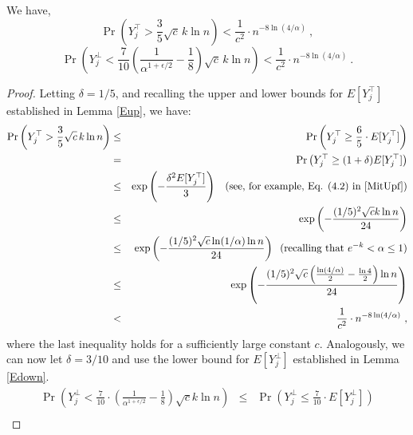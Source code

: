\documentclass[11pt]{article}
\begin{document}
\begin{lemma}\label{lepa1}
We have,
\begin{equation*}
    	\Pr\left(Y^{\top}_j >  \frac{3}{5}\sqrt{c}\, k \ln n \right) 
     <  \frac{1}{c^2} \cdot n^{-8\ln(4/\alpha)}  \ , 
\end{equation*}
\begin{equation*}
    	\Pr\left(Y^{\perp}_j <  
     \frac{7}{10} \left (\frac{1}{\alpha^{1+\epsilon/2}} - \frac{1}{8} \right ) \sqrt{c}\, k \ln n \right)  
     <  \frac{1}{c^2} \cdot n^{-8\ln(4/\alpha)}  \ .
\end{equation*}
\end{lemma}

\begin{proof}

Letting $\delta = 1/5$, and recalling the upper and lower bounds for 
$E[Y^{\top}_j]$ established in Lemma \ref{Eup}, we have:
    \begin{eqnarray*}
    	\Pr\left(Y^{\top}_j >  \frac{3}{5} \sqrt{c}\, k \ln n \right)   
    	&\le &  \Pr\left(Y^{\top}_{j} \ge \frac{6}{5}\cdot E[Y^{\top}_j] \right) \\ 
    	&=   &  \Pr\left(Y^{\top}_{j} \ge (1+\delta) E[Y^{\top}_j] \right) \\      
    	&\le & \exp\left(-\frac{\delta^2 E[Y^{\top}_j]}{3}\right) \;\;\; \text{(see, for example, Eq. (4.2) in \cite{MitUpf})} \nonumber \\
    	&\le & \exp\left(- \frac{(1/5)^2  \sqrt{c} k \ln n}{24 }\right)  \\
    	&\le & \exp\left(- \frac{(1/5)^2  \sqrt{c} \ln (1/\alpha) \ln n}{24 }\right)  
              \;\; \text{(recalling that $e^{-k} < \alpha \le 1$}) \\  
    	&\le & \exp\left(- \frac{(1/5)^2  \sqrt{c} \left( \frac{\ln (4/\alpha)}{2}-\frac{\ln 4}{2} \right) \ln n}{24 }\right) \\             
    	&<& \frac{1}{c^2} \cdot n^{-8\ln(4/\alpha)} \ , 
    \end{eqnarray*}
   where the last inequality holds for a sufficiently large constant $c$.
Analogously, we can now let $\delta = 3/10$ and use the lower bound for 
$E[Y^{\perp}_j]$ established in Lemma \ref{Edown}.
    \begin{eqnarray*}
    	\Pr\left(Y^{\perp}_j <  \frac{7}{10}\cdot 
         \left( \frac{1}{\alpha^{1 + \epsilon/2}} - \frac{1}{8}\right )\sqrt{c} k \ln n \right)   
    	&\le &  \Pr\left(Y^{\perp}_{j} \le \frac{7}{10}\cdot E[Y^{\perp}_j]\right) \nonumber\\ 

\end{eqnarray*}
\end{proof}
\end{document}
